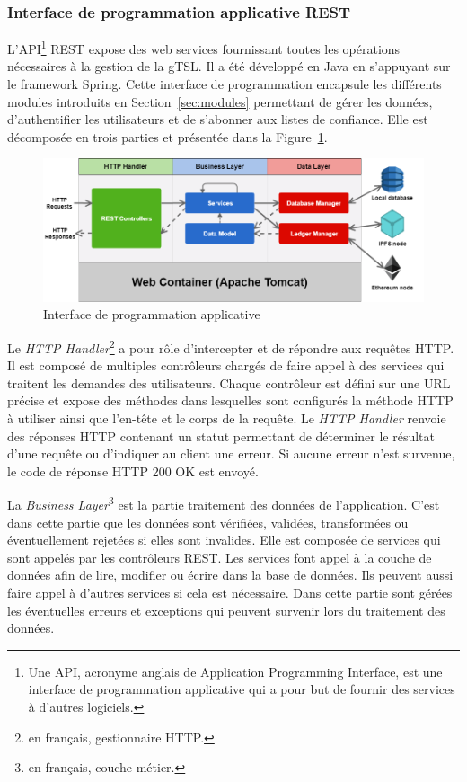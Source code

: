\documentclass{tnreport}
\begin{document}
\subsubsection{Interface de programmation applicative REST}

L'API\footnote{Une API, acronyme anglais de Application Programming Interface, est une interface de programmation applicative qui a pour but de fournir des services à d'autres logiciels.} REST expose des web services fournissant toutes les opérations nécessaires à la gestion de la gTSL. Il a été développé en Java en s'appuyant sur le framework Spring. Cette interface de programmation encapsule les différents modules introduits en Section~\ref{sec:modules} permettant de gérer les données, d'authentifier les utilisateurs et de s'abonner aux listes de confiance. Elle est décomposée en trois parties et présentée dans la Figure~\ref{fig:rest-api}.

\begin{figure}[h]
	\centering
	\includegraphics[scale=0.52]{figures/rest-api}
	\caption{Interface de programmation applicative}
	\label{fig:rest-api}
\end{figure}

Le \textit{HTTP Handler}\footnote{en français, gestionnaire HTTP.} a pour rôle d'intercepter et de répondre aux requêtes HTTP. Il est composé de multiples contrôleurs chargés de faire appel à des services qui traitent les demandes des utilisateurs. Chaque contrôleur est défini sur une URL précise et expose des méthodes dans lesquelles sont configurés la méthode HTTP à utiliser ainsi que l'en-tête et le corps de la requête. Le \textit{HTTP Handler} renvoie des réponses HTTP contenant un statut permettant de déterminer le résultat d'une requête ou d'indiquer au client une erreur. Si aucune erreur n'est survenue, le code de réponse HTTP 200 OK est envoyé.

La \textit{Business Layer}\footnote{en français, couche métier.} est la partie traitement des données de l'application. C'est dans cette partie que les données sont vérifiées, validées, transformées ou éventuellement rejetées si elles sont invalides. Elle est composée de services qui sont appelés par les contrôleurs REST. Les services font appel à la couche de données afin de lire, modifier ou
écrire dans la base de données. Ils peuvent aussi faire appel à d'autres services si cela est nécessaire. Dans cette partie sont gérées les éventuelles erreurs et exceptions qui peuvent survenir lors du traitement des données.
\end{document}
